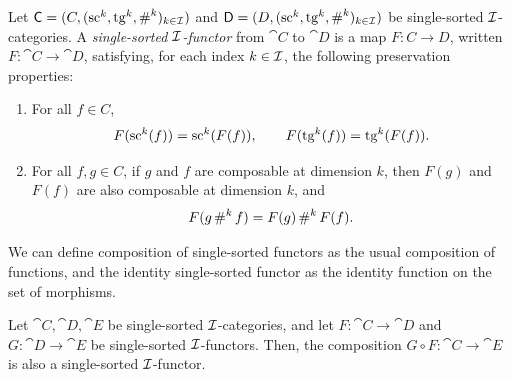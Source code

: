 \begin{definition}
  \label{def:SingleSortedFunctor}
  \leanok
  Let $\mathsf{C} = (C, (\operatorname{sc}^k, \operatorname{tg}^k, \operatorname{\#}^k)_{k \in \mathcal{I}})$ and $\mathsf{D} = (D, (\operatorname{sc}^k, \operatorname{tg}^k,
  \operatorname{\#}^k)_{k \in \mathcal{I}})$ be single-sorted $\mathcal{I}$-categories. A \emph{single-sorted
  $\mathcal{I}$-functor} from $\cat{C}$ to $\cat{D}$ is a map $F \colon C \to D$, written $F \colon
  \cat{C} \to \cat{D}$, satisfying, for each index $k \in \mathcal{I}$, the following preservation
  properties:

  \begin{enumerate}
    \item \label{ax:ss_fun_sc_tg} For all $f \in C$,
      \[
        F (\operatorname{sc}^k (f)) = \operatorname{sc}^k (F (f)), \qquad F (\operatorname{tg}^k (f)) = \operatorname{tg}^k (F (f)).
      \]
    \item \label{ax:ss_fun_comp} For all $f, g \in C$, if $g$ and $f$ are composable at dimension
      $k$, then $F (g)$ and $F (f)$ are also composable at dimension $k$, and
      \[
        F (g \operatorname{\#}^k f) = F (g) \operatorname{\#}^k F (f).
      \]
  \end{enumerate}
\end{definition}

We can define composition of single-sorted functors as the usual composition of functions, and the
identity single-sorted functor as the identity function on the set of morphisms.

\begin{construction}
  \label{def:SingleSortedFunctor_comp}
  \leanok
  Let $\cat{C}, \cat{D}, \cat{E}$ be single-sorted $\mathcal{I}$-categories, and let $F \colon \cat{C}
  \to \cat{D}$ and $G \colon \cat{D} \to \cat{E}$ be single-sorted $\mathcal{I}$-functors. Then, the
  composition $G \circ F \colon \cat{C} \to \cat{E}$ is also a single-sorted $\mathcal{I}$-functor.
\end{construction}


